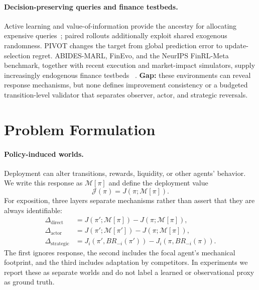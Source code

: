 \documentclass{article} %
\newcommand{\M}{\mathcal{M}}
\newcommand{\J}{\mathcal{J}}
\newcommand{\pii}{\pi}
\newcommand{\pip}{\pi'}
\begin{document}
\paragraph{Decision-preserving queries and finance testbeds.}
Active learning and value-of-information provide the ancestry for allocating
expensive queries~\cite{settles2009active,lindley1956information}; paired
rollouts additionally exploit shared exogenous randomness. PIVOT changes the
target from global prediction error to update-selection regret. ABIDES-MARL,
FinEvo, and the NeurIPS FinRL-Meta benchmark, together with recent execution
and market-impact simulators, supply increasingly endogenous finance testbeds
~\cite{abidesmarl2025,finevo2026,finrlmeta2022,byrd2019abides,cont2010price,nevmyvaka2006execution}.
\textbf{Gap:} these environments can reveal response mechanisms, but none
defines improvement consistency or a budgeted transition-level validator that
separates observer, actor, and strategic reversals.

\section{Problem Formulation}
\paragraph{Policy-induced worlds.}
Deployment can alter transitions, rewards, liquidity, or other agents'
behavior. We write this response as $\M[\pi]$ and define the deployment value
\begin{equation}
    \J(\pi)=J(\pi;\M[\pi]).
\end{equation}
For exposition, three layers separate mechanisms rather than assert that they
are always identifiable:
\begin{align}
 \Delta_{\mathrm{direct}} &= J(\pip;\M[\pii])-J(\pii;\M[\pii]),\\
 \Delta_{\mathrm{actor}} &= J(\pip;\M[\pip])-J(\pii;\M[\pii]),\\
 \Delta_{\mathrm{strategic}} &= J_i(\pip,BR_{-i}(\pip))
                              -J_i(\pii,BR_{-i}(\pii)).
\end{align}
The first ignores response, the second includes the focal agent's mechanical
footprint, and the third includes adaptation by competitors. In experiments we
report these as separate worlds and do not label a learned or observational
proxy as ground truth.
\end{document}
